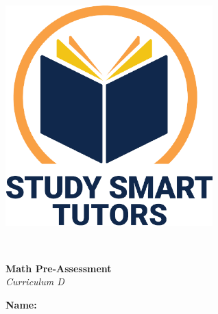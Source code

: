 \documentclass[12pt]{article}
\title{}
\date{}
\begin{document}
\thispagestyle{empty}

\vspace*{\fill}

\vspace*{3cm}

\begin{center}

    \includegraphics[width=0.6\textwidth]{SST_Color_Logo.png} %
    
    \vspace{1cm} %
    
    \Huge \textbf{} \\
    \vspace{0.2cm}
    
    \Huge \textbf{ Math Pre-Assessment}\\
    \LARGE \textit{Curriculum D}\\  
    [2cm]

 \vspace{0.5cm}
    
   


    \LARGE \textbf{Name:} \underline{\hspace{8cm}}
    
    
    \vspace{0.5cm}
    
    \vspace{1cm}
   
    
    \vfill %
    
\end{center}
\end{document}

